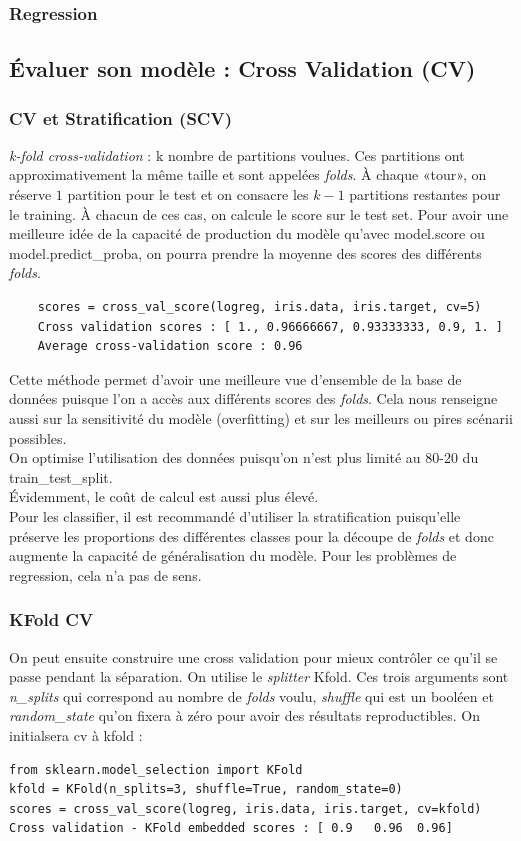 \documentclass[a4paper,12pt]{report}
\newcommand\bk{\color{black}}
\newcommand\brick{\color{brick}}
\numberwithin{equation}{section} %
\begin{document}
\subsubsection{Regression}
\brick \subsection{Évaluer son modèle : Cross Validation (CV)} \bk
\subsubsection{CV et Stratification (SCV)}
\textit{k-fold cross-validation} : k nombre de partitions voulues. Ces partitions ont approximativement la même taille et sont appelées \textit{folds}. À chaque «tour», on réserve $1$ partition pour le test et on consacre les $k-1$ partitions restantes pour le training.
À chacun de ces cas, on calcule le score sur le test set. Pour avoir une meilleure idée de la capacité de production du modèle qu'avec model.score ou model.predict\_proba, on pourra prendre la moyenne des scores des différents \textit{folds}.
\begin{lstlisting}
	scores = cross_val_score(logreg, iris.data, iris.target, cv=5)	
	Cross validation scores : [ 1., 0.96666667, 0.93333333, 0.9, 1. ]	
	Average cross-validation score : 0.96
\end{lstlisting}

\noindent Cette méthode permet d'avoir une meilleure vue d'ensemble de la base de données puisque l'on a accès aux différents scores des \textit{folds}.
Cela nous renseigne aussi sur la sensitivité du modèle (overfitting) et sur les meilleurs ou pires scénarii possibles.\\
On optimise l'utilisation des données puisqu'on n'est plus limité au 80-20 du train\_test\_split.\\
Évidemment, le coût de calcul est aussi plus élevé. \\
Pour les classifier, il est recommandé d'utiliser la stratification puisqu'elle préserve les proportions des différentes classes pour la découpe de \textit{folds} et donc augmente la capacité de généralisation du modèle. Pour les problèmes de regression, cela n'a pas de sens.\\

\subsubsection{KFold CV}
On peut ensuite construire une cross validation pour mieux contrôler ce qu'il se passe pendant la séparation.
On utilise le \textit{splitter} Kfold. Ces trois arguments sont \color{red}\textit{n\_splits} \bk qui correspond au nombre de \textit{folds} voulu, \color{red} \textit{shuffle} \bk qui est un booléen et \color{red}\textit{random\_state} \bk qu'on fixera à zéro pour avoir des résultats reproductibles. On initialsera \color{red} cv \bk à kfold :
\begin{lstlisting}
from sklearn.model_selection import KFold
kfold = KFold(n_splits=3, shuffle=True, random_state=0)
scores = cross_val_score(logreg, iris.data, iris.target, cv=kfold)
Cross validation - KFold embedded scores : [ 0.9   0.96  0.96]
\end{lstlisting}
\end{document}
